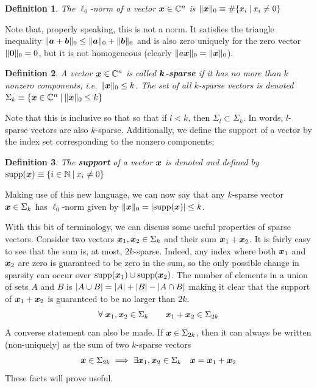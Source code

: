 \documentclass[twocolumn]{gwclass}
\newtheorem{definition}{Definition}
\newcommand{\C}{\mathbb{C}}
\begin{document}
	\begin{definition}
		The $\ell_0$-norm of a vector $\*x\in\C^n$ is 	$ \|\boldsymbol{x}\|_0 \equiv \#\{ x_i \:|\: x_i\neq 0\} $
	\end{definition}

	Note that, properly speaking, this is not a norm. It satisfies the triangle inequality $\|\boldsymbol{a}+\boldsymbol{b}\|_0\leq \|\boldsymbol{a}\|_0+\|\boldsymbol{b}\|_0$ and is also zero uniquely for the zero vector $\|\boldsymbol{0}\|_0=0$, but it is not homogeneous (clearly $\|a\boldsymbol{x}\|_0=\|\boldsymbol{x}\|_0$). 
	
	\begin{definition}
		A vector $\*x\in\C^n$ is called \textbf{$\boldsymbol{k}$-sparse} if it has no more than $k$ nonzero components, i.e. $\|\boldsymbol{x}\|_0\leq k$. The set of all $k$-sparse vectors is denoted $\Sigma_k \equiv \{ \boldsymbol{x}\in\mathbb{C}^n \:|\: \|\boldsymbol{x}\|_0\leq k\}$
	\end{definition}
	Note that this is inclusive so that so that if $l<k$, then $\Sigma_l\subset \Sigma_k$. In words, $l$-sparse vectors are also $k$-sparse. Additionally, we define the support of a vector by the index set corresponding to the nonzero components:
	\begin{definition}
		The \textbf{support} of a vector $\boldsymbol{x}$ is denoted and defined by $ \text{\normalfont{supp}}(\boldsymbol{x}) \equiv \{i\in\mathbb{N} \:|\: x_i\neq 0\} $
	\end{definition}
	Making use of this new language, we can now say that any $k$-sparse vector $\boldsymbol{x}\in\Sigma_k$ has $\ell_0$-norm given by $\|\boldsymbol{x}\|_0=\abs{\text{\normalfont{supp}}(\boldsymbol{x})}\leq k$. 
	
	With this bit of terminology, we can discuss some useful properties of sparse vectors. Consider two vectors $\boldsymbol{x}_1,\boldsymbol{x}_2\in\Sigma_k$ and their sum $\boldsymbol{x}_1+\boldsymbol{x}_2$. It is fairly easy to see that the sum is, at most, $2k$-sparse. Indeed, any index where both $\boldsymbol{x}_1$ and $\boldsymbol{x}_2$ are zero is guaranteed to be zero in the sum, so the only possible change in sparsity can occur over $\text{\normalfont{supp}}(\boldsymbol{x}_1)\cup \text{\normalfont{supp}}(\boldsymbol{x}_2)$. The number of elements in a union of sets $A$ and $B$ is $ \abs{A\cup B} = \abs{A} + \abs{B} - \abs{A\cap B}$ making it clear that the support of $\boldsymbol{x}_1+\boldsymbol{x}_2$ is guaranteed to be no larger than $2k$.
	$$ \forall\; \boldsymbol{x}_1,\boldsymbol{x}_2\in\Sigma_k \quad\quad \boldsymbol{x}_1+\boldsymbol{x}_2 \in \Sigma_{2k} $$
	A converse statement can also be made. If $\boldsymbol{x}\in\Sigma_{2k}$, then it can always be written (non-uniquely) as the sum of two $k$-sparse vectors
	$$ \boldsymbol{x}\in\Sigma_{2k} \implies \exists \boldsymbol{x}_1,\boldsymbol{x}_2\in\Sigma_k \quad \boldsymbol{x}=\boldsymbol{x}_1+\boldsymbol{x}_2 $$ 
	These facts will prove useful.
	
\end{document}
